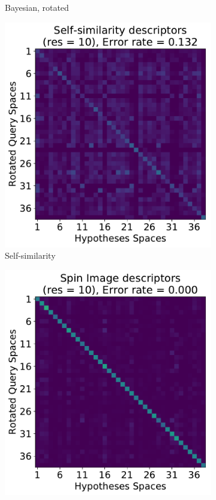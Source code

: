 \begin{figure}[t!]
\begin{subfigure}[]{0.235\textwidth}
		\caption{Bayesian, rotated}
		\label{fig:heatmap-b}
	\end{subfigure}
	\begin{subfigure}[]{0.235\textwidth}
		\includegraphics[width=\textwidth]{figures/plots/heatmap-ss10}
		\caption{Self-similarity}
		\label{fig:heatmap-ss}
	\end{subfigure}
	\begin{subfigure}[]{0.235\textwidth}
		\includegraphics[width=\textwidth]{figures/plots/heatmap-si10}

\end{subfigure}
\end{figure}
